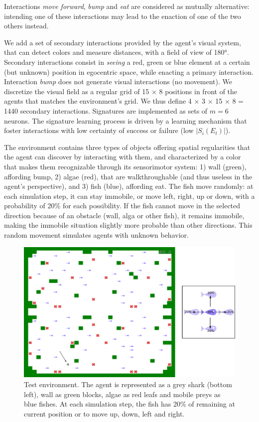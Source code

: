 \documentclass[conference]{IEEEtran}
\begin{document}
Interactions \textit{move forward}, \textit{bump} and \textit{eat} are considered as mutually alternative: intending one of these interactions may lead to the enaction of one of the two others instead.

We add a set of secondary interactions provided by the agent’s visual system, that can detect colors and measure distances, with a field of view of 180°.
Secondary interactions consist in \textit{seeing} a red, green or blue element at a certain (but unknown) position in egocentric space, while enacting a primary interaction.
Interaction \textit{bump} does not generate visual interactions (no movement).
We discretize the visual field as a regular grid of 15 × 8 positions in front of the agents that matches the environment's grid.
We thus define 4 × 3 × 15 × 8 = 1440 secondary interactions.
Signatures are implemented as sets of $m=6$ neurons.
The signature learning process is driven by a learning mechanism that foster interactions with low certainty of success or failure (low $|S_i(E_t)|$).

The environment contains three types of objects offering spatial regularities that the agent can discover by interacting with them, and characterized by a color that makes them recognizable through its sensorimotor system: 1) wall (green), affording bump, 2) algae (red), that are walkthroughable (and thus useless in the agent's perspective), and 3) fish (blue), affording eat.
The fish move randomly: at each simulation step, it can stay immobile, or move left, right, up or down, with a probability of 20\% for each possibility.
If the fish cannot move in the selected direction because of an obstacle (wall, alga or other fish), it remains immobile, making the immobile situation slightly more probable than other directions. This random movement simulates agents with unknown behavior.

\begin{figure}[htbp]
\centerline{\includegraphics[scale=0.28]{img/environment.pdf}}
\caption{Test environment. The agent is represented as a grey shark (bottom left), wall as green blocks, algae as red leafs and mobile preys as blue fishes. At each simulation step, the fish has 20\% of remaining at current position or to move up, down, left and right.
}
\label{fig:environment}
\end{figure}
\end{document}
